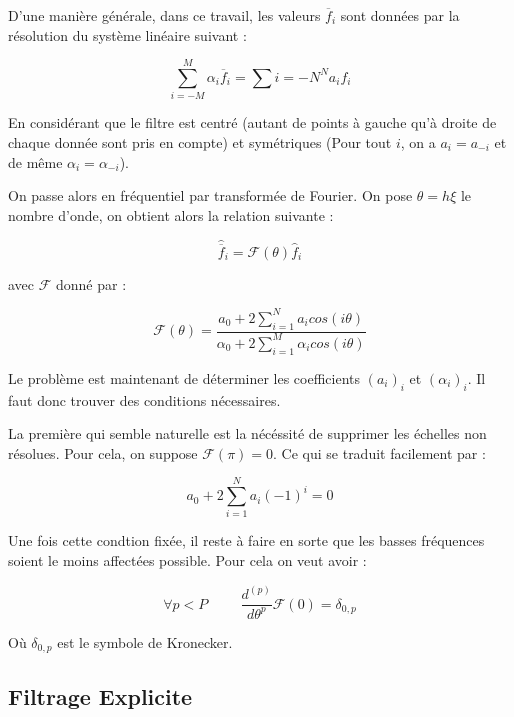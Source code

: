 \documentclass[10pt,a4paper]{amsart}
\begin{document}
D'une manière générale, dans ce travail, les valeurs $\overline{f}_i$ sont données par la résolution du système linéaire suivant :

\begin{equation}
  \label{filtre general}
  \sum_{i=-M}^M \alpha_i \overline{f}_{i} = \sum{i=-N}^N a_i f_i
\end{equation}

En considérant que le filtre est centré (autant de points à gauche qu'à droite de chaque donnée sont pris en compte) et symétriques (Pour tout $i$, on a $a_i = a_{-i}$ et de même $\alpha_i = \alpha_{-i}$).

On passe alors en fréquentiel par transformée de Fourier. On pose $\theta = h \xi$ le nombre d'onde, on obtient alors la relation suivante :

\begin{equation}
  \label{filtre frequentiel}
  \widehat{\overline{f}}_i = \mathcal{F} ( \theta )  \widehat{f}_i
\end{equation}

avec $\mathcal{F}$ donné par :

$$\mathcal{F} ( \theta ) = \dfrac{a_0 + 2 \sum_{i=1}^N  a_i  cos ( i \theta ) }{\alpha_0 + 2 \sum_{i=1}^M \alpha_i cos ( i \theta )}$$

Le problème est maintenant de déterminer les coefficients $(a_i)_i$ et $(\alpha_i)_i$. Il faut donc trouver des conditions nécessaires.

La première qui semble naturelle est la nécéssité de supprimer les échelles non résolues. Pour cela, on suppose $\mathcal{F}(\pi) = 0$. Ce qui se traduit facilement par :

\begin{equation}
  \label{eq:cond1}
  a_0 + 2 \sum_{i=1}^N a_i (-1)^i = 0
\end{equation}

Une fois cette condtion fixée, il reste à faire en sorte que les basses fréquences soient le moins affectées possible. Pour cela on veut avoir :

\begin{equation}
  \label{eq:cond2}
  \forall p < P \hspace{1cm} \dfrac{d^{(p)}}{d \theta^p} \mathcal{F} ( 0 ) = \delta_{0,p} 
\end{equation}

Où $\delta_{0,p}$ est le symbole de Kronecker. 

\subsection{Filtrage Explicite}
\end{document}
